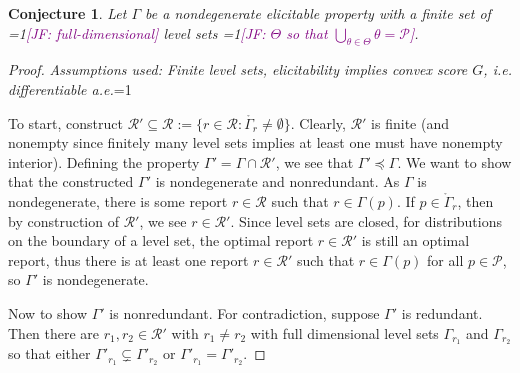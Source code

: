 \documentclass[12pt]{article}
\newcommand{\Comments}{1}
\newcommand{\mynote}[2]{\ifnum\Comments=1\textcolor{#1}{#2}\fi}
\newcommand{\mytodo}[2]{\ifnum\Comments=1%
  \todo[linecolor=#1!80!black,backgroundcolor=#1,bordercolor=#1!80!black]{#2}\fi}
\newcommand{\raft}[1]{\mytodo{green!20!white}{RF: #1}}
\newcommand{\jessie}[1]{\mynote{purple}{[JF: #1]}}
\renewcommand{\P}{\mathcal{P}}
\newcommand{\R}{\mathcal{R}}
\newcommand{\inter}[1]{\mathring{#1}}%
\newtheorem{conjecture}{Conjecture}
\begin{document}
\begin{conjecture}\label{conj:gam-prime-exists}
	Let $\Gamma$ be a nondegenerate elicitable property with a finite set of \jessie{full-dimensional} level sets \jessie{$\Theta$ so that $\bigcup_{\theta \in \Theta}\theta = \P$}.
\end{conjecture}
\begin{proof}
\emph{Assumptions used: Finite level sets, elicitability implies convex score $G$, i.e. differentiable a.e.}\raft{Confused by BR}

	To start, construct $\R' \subseteq \R := \{ r \in \R : \inter{\Gamma_r} \neq \emptyset \}$.
	Clearly, $\R'$ is finite (and nonempty since finitely many level sets implies at least one must have nonempty interior).
	Defining the property $\Gamma' = \Gamma\cap \R'$, we see that $\Gamma' \preceq \Gamma$.
	We want to show that the constructed $\Gamma'$ is nondegenerate and nonredundant.
	As $\Gamma$ is nondegenerate, there is some report $r \in \R$ such that $r \in \Gamma(p)$.
	If $p \in \inter{\Gamma}_r$, then by construction of $\R'$, we see $r \in \R'$.
	Since level sets are closed, for distributions on the boundary of a level set, the optimal report $r \in \R'$ is still an optimal report, thus there is at least one report $r \in \R'$ such that $r \in \Gamma(p)$ for all $p \in \P$, so $\Gamma'$ is nondegenerate. 

	
	
	Now to show $\Gamma'$ is nonredundant.
	For contradiction, suppose $\Gamma'$ is redundant.
	Then there are $r_1, r_2 \in \R'$ with $r_1 \neq r_2$ with full dimensional level sets $\Gamma_{r_1}$ and $\Gamma_{r_2}$ so that either $\Gamma'_{r_1} \subsetneq \Gamma'_{r_2}$ or $\Gamma'_{r_1} = \Gamma'_{r_2}$.
	

\end{proof}
\end{document}
